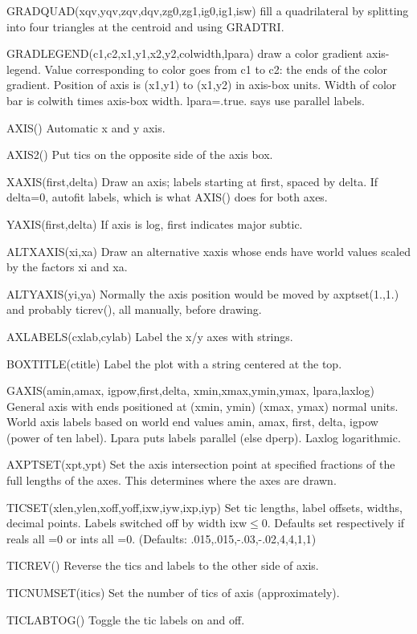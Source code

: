 GRADQUAD(xqv,yqv,zqv,dqv,zg0,zg1,ig0,ig1,isw) fill a quadrilateral 
by splitting into four triangles at the centroid and using GRADTRI. 

GRADLEGEND(c1,c2,x1,y1,x2,y2,colwidth,lpara) draw a color gradient
axis-legend. Value corresponding to color goes from c1 to c2: the ends of
the color gradient. Position of axis is (x1,y1) to (x1,y2) in axis-box
units. Width of color bar is colwith times axis-box
width. lpara=.true. says use parallel labels.



AXIS() Automatic x and y axis.

AXIS2() Put tics on the opposite side of the axis box.

XAXIS(first,delta) Draw an axis; labels starting at first, spaced by delta.
If delta=0, autofit labels, which is what AXIS() does for both axes.

YAXIS(first,delta) If axis is log, first indicates major subtic.

ALTXAXIS(xi,xa) Draw an alternative xaxis whose ends have world values
scaled by the factors xi and xa.

ALTYAXIS(yi,ya) Normally the axis position would be moved by
axptset(1.,1.) and probably ticrev(), all manually, before drawing.

AXLABELS(cxlab,cylab) Label the x/y axes with strings.

BOXTITLE(ctitle) Label the plot with a string centered at the top.

GAXIS(amin,amax, igpow,first,delta, xmin,xmax,ymin,ymax, lpara,laxlog)
General axis with ends positioned at (xmin, ymin) (xmax, ymax) normal
units. World axis labels based on world end values amin, amax, first, delta,
igpow (power of ten label).  Lpara puts labels parallel (else
dperp). Laxlog logarithmic.

AXPTSET(xpt,ypt) Set the axis intersection point at specified fractions of
the full lengths of the axes. This determines where the axes are drawn.

TICSET(xlen,ylen,xoff,yoff,ixw,iyw,ixp,iyp) Set tic lengths, label
offsets, widths, decimal points. Labels switched off by width
ixw$\le$0. Defaults set respectively if reals all =0 or ints all
=0. (Defaults: .015,.015,-.03,-.02,4,4,1,1)

TICREV() Reverse the tics and labels to the other side of axis.

TICNUMSET(itics) Set the number of tics of axis (approximately).

TICLABTOG() Toggle the tic labels on and off.

